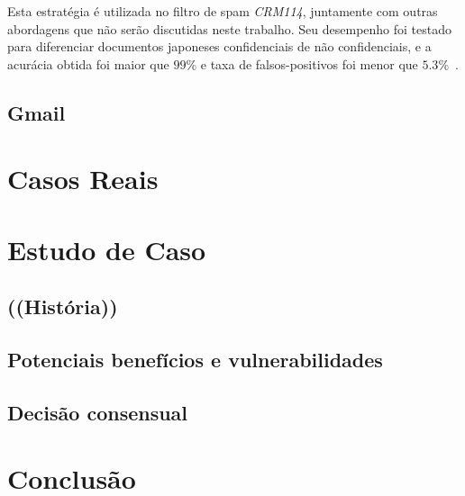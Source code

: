 \documentclass[a4paper,dvipdfm]{article}
\begin{document}
	Esta estratégia é utilizada no filtro de spam \emph{CRM114}, juntamente com outras abordagens que não serão discutidas neste trabalho. Seu desempenho foi testado para diferenciar documentos japoneses confidenciais de não confidenciais, e a acurácia obtida foi maior que $99\%$ e taxa de falsos-positivos foi menor que $5.3\%$~\cite{fmarkov:japtest}.

	\subsection{Gmail}

\section{Casos Reais}

\section{Estudo de Caso}
\subsection{((História))}
\subsection{Potenciais benefícios e vulnerabilidades}
\subsection{Decisão consensual}

\section{Conclusão}




%
\end{document}
